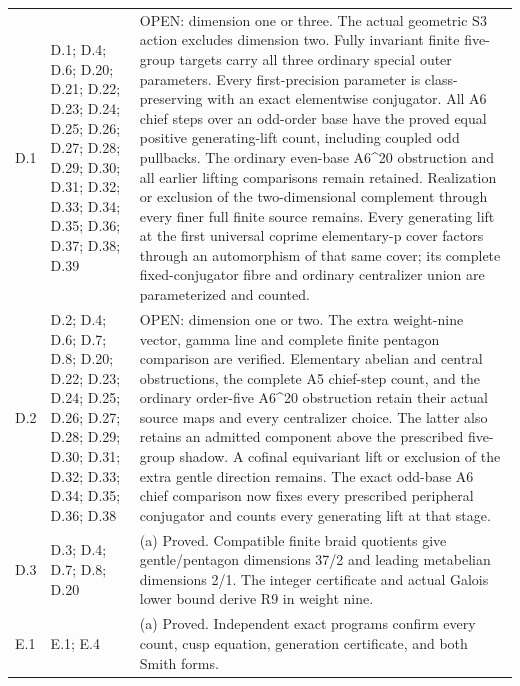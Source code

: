 \begin{longtable}{@{}p{1.1cm}p{3.0cm}p{10.3cm}@{}}
D.1 & D.1; D.4; D.6; D.20; D.21; D.22; D.23; D.24; D.25; D.26; D.27; D.28; D.29; D.30; D.31; D.32; D.33; D.34; D.35; D.36; D.37; D.38; D.39 & OPEN: dimension one or three. The actual geometric S3 action excludes dimension two. Fully invariant finite five-group targets carry all three ordinary special outer parameters. Every first-precision parameter is class-preserving with an exact elementwise conjugator. All A6 chief steps over an odd-order base have the proved equal positive generating-lift count, including coupled odd pullbacks. The ordinary even-base A6\textasciicircum{}20 obstruction and all earlier lifting comparisons remain retained. Realization or exclusion of the two-dimensional complement through every finer full finite source remains. Every generating lift at the first universal coprime elementary-p cover factors through an automorphism of that same cover; its complete fixed-conjugator fibre and ordinary centralizer union are parameterized and counted. \\
D.2 & D.2; D.4; D.6; D.7; D.8; D.20; D.22; D.23; D.24; D.25; D.26; D.27; D.28; D.29; D.30; D.31; D.32; D.33; D.34; D.35; D.36; D.38 & OPEN: dimension one or two. The extra weight-nine vector, gamma line and complete finite pentagon comparison are verified. Elementary abelian and central obstructions, the complete A5 chief-step count, and the ordinary order-five A6\textasciicircum{}20 obstruction retain their actual source maps and every centralizer choice. The latter also retains an admitted component above the prescribed five-group shadow. A cofinal equivariant lift or exclusion of the extra gentle direction remains. The exact odd-base A6 chief comparison now fixes every prescribed peripheral conjugator and counts every generating lift at that stage. \\
D.3 & D.3; D.4; D.7; D.8; D.20 & (a) Proved. Compatible finite braid quotients give gentle/pentagon dimensions 37/2 and leading metabelian dimensions 2/1. The integer certificate and actual Galois lower bound derive R9 in weight nine. \\
E.1 & E.1; E.4 & (a) Proved. Independent exact programs confirm every count, cusp equation, generation certificate, and both Smith forms. \\

\end{longtable}
